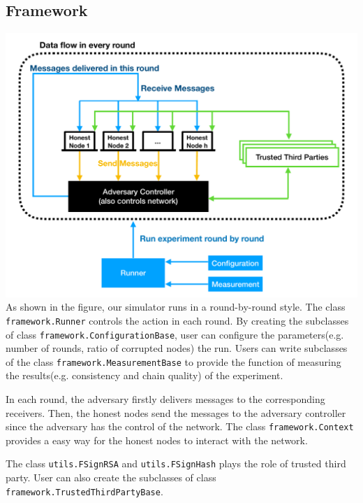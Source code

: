 \documentclass[
10pt, %
a4paper, %
oneside, %
headinclude,footinclude, %
BCOR5mm, %
]{scrartcl}
\begin{document}
\subsection{Framework}
\includegraphics[scale=0.3]{structure}\\
As shown in the figure, our simulator runs in a round-by-round style. The class \verb|framework.Runner| controls the action in each round. By creating the subclasses of class \verb|framework.ConfigurationBase|, user can configure the parameters(e.g. number of rounds, ratio of corrupted nodes) the run. Users can write subclasses of the class \verb|framework.MeasurementBase| to provide the function of measuring the results(e.g. consistency and chain quality) of the experiment.
\par In each round, the adversary firstly delivers messages to the corresponding receivers. Then, the honest nodes send the messages to the adversary controller since the adversary has the control of the network. The class \verb|framework.Context| provides a easy way for the honest nodes to interact with the network.
\par The class \verb|utils.FSignRSA| and \verb|utils.FSignHash| plays the role of trusted third party. User can also create the subclasses of class \newline \verb|framework.TrustedThirdPartyBase|.
\end{document}
